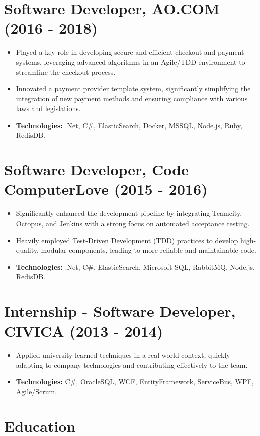 \documentclass[12pt,a4paper]{res}
\begin{document}
\begin{resume}
\section{\bf Software Developer, AO.COM (2016 - 2018)}
\begin{itemize}
\item Played a key role in developing secure and efficient checkout and payment systems, leveraging advanced algorithms in an Agile/TDD environment to streamline the checkout process.
\item Innovated a payment provider template system, significantly simplifying the integration of new payment methods and ensuring compliance with various laws and legislations.
\item \textbf{Technologies:} .Net, C\#, ElasticSearch, Docker, MSSQL, Node.js, Ruby, RedisDB.
\end{itemize}

\section{\bf Software Developer, Code ComputerLove (2015 - 2016)}
\begin{itemize}
\item Significantly enhanced the development pipeline by integrating Teamcity, Octopus, and Jenkins with a strong focus on automated acceptance testing.
\item Heavily employed Test-Driven Development (TDD) practices to develop high-quality, modular components, leading to more reliable and maintainable code.
\item \textbf{Technologies:} .Net, C\#, ElasticSearch, Microsoft SQL, RabbitMQ, Node.js, RedisDB.
\end{itemize}

\section{\bf Internship - Software Developer, CIVICA (2013 - 2014)}
\begin{itemize}
\item Applied university-learned techniques in a real-world context, quickly adapting to company technologies and contributing effectively to the team.
\item \textbf{Technologies:} C\#, OracleSQL, WCF, EntityFramework, ServiceBus, WPF, Agile/Scrum.
\end{itemize}


\section{\large\bf Education}


\end{resume}
\end{document}
